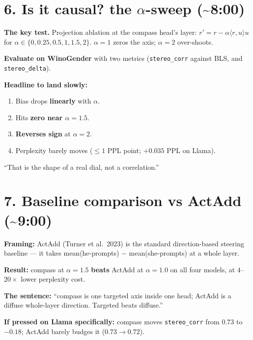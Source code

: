 \documentclass[11pt]{article}
\begin{document}
\section*{6. Is it causal? the $\alpha$-sweep (\textasciitilde 8:00)}
\begin{tcolorbox}[beat]
\textbf{The key test.} Projection ablation at the compass head's layer:
$r' = r - \alpha \langle r, u \rangle u$ for $\alpha \in \{0, 0.25, 0.5, 1, 1.5, 2\}$.
$\alpha{=}1$ zeros the axis; $\alpha{=}2$ over-shoots.

\textbf{Evaluate on WinoGender} with two metrics (\texttt{stereo\_corr}
against BLS, and \texttt{stereo\_delta}).

\textbf{Headline to land slowly:}
\begin{enumerate}
  \item Bias drops \textbf{linearly} with $\alpha$.
  \item Hits \textbf{zero near $\alpha{=}1.5$}.
  \item \textbf{Reverses sign} at $\alpha{=}2$.
  \item Perplexity barely moves ($\leq 1$ PPL point; $+0.035$ PPL on Llama).
\end{enumerate}
``That is the shape of a real dial, not a correlation.''
\end{tcolorbox}

\section*{7. Baseline comparison vs ActAdd (\textasciitilde 9:00)}
\begin{tcolorbox}[beat]
\textbf{Framing:} ActAdd (Turner et al.\ 2023) is the standard
direction-based steering baseline --- it takes mean(he-prompts) $-$
mean(she-prompts) at a whole layer.

\textbf{Result:} compass at $\alpha{=}1.5$ \textbf{beats} ActAdd at
$\alpha{=}1.0$ on all four models, at $4$--$20\times$ lower perplexity cost.

\textbf{The sentence:} ``compass is one targeted axis inside one head;
ActAdd is a diffuse whole-layer direction. Targeted beats diffuse.''

\textbf{If pressed on Llama specifically:} compass moves
\texttt{stereo\_corr} from $0.73$ to $-0.18$; ActAdd barely budges it
($0.73 \to 0.72$).
\end{tcolorbox}
\end{document}
